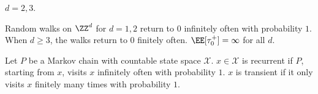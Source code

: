 \begin{example}
\exlabel 

$d=2,3$. 
\end{example}


\begin{theorem}
\lemlabel 

Random walks on $\ZZ^d$ for $d=1,2$ return to $0$ infinitely often with probability $1$. When $d\geq 3$, the walks return to $0$ finitely often. $\EE[\tau_{0}^+] = \infty$ for all $d$. 
\end{theorem}

\begin{definition}

Let $P$ be a Markov chain with countable state space $\mathcal{X}$. $x\in \mathcal{X}$ is \ac{recurrent} if $P$, starting from $x$, visits $x$ infinitely often with probability $1$. $x$ is \ac{transient} if it only visits $x$ finitely many times with probability $1$. 
\end{definition}
